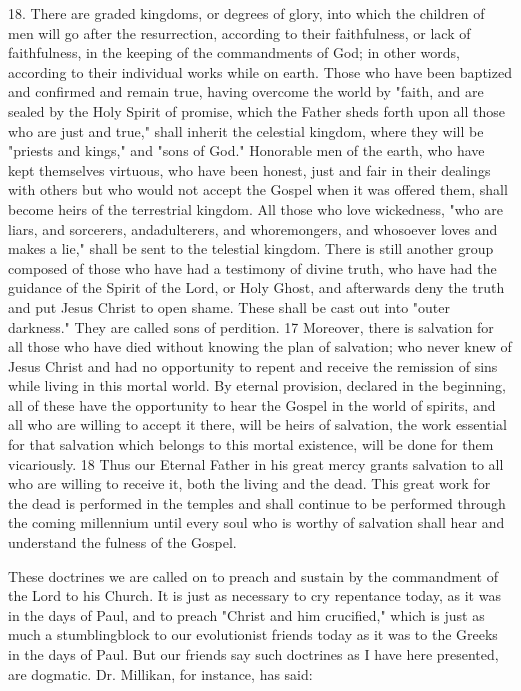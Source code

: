 18. There are graded kingdoms, or degrees of glory, into which the children of men will go
after the resurrection, according to their faithfulness, or lack of faithfulness, in the keeping of
the commandments of God; in other words, according to their individual works while on
earth. Those who have been baptized and confirmed and remain true, having overcome the
world by "faith, and are sealed by the Holy Spirit of promise, which the Father sheds forth
upon all those who are just and true," shall inherit the celestial kingdom, where they will be
"priests and kings," and "sons of God." Honorable men of the earth, who have kept
themselves virtuous, who have been honest, just and fair in their dealings with others but
who would not accept the Gospel when it was offered them, shall become heirs of the
terrestrial kingdom. All those who love wickedness, "who are liars, and sorcerers, andadulterers, and whoremongers, and whosoever loves and makes a lie," shall be sent to the
telestial kingdom. There is still another group composed of those who have had a testimony
of divine truth, who have had the guidance of the Spirit of the Lord, or Holy Ghost, and
afterwards deny the truth and put Jesus Christ to open shame. These shall be cast out into
"outer darkness." They are called sons of perdition. 17 Moreover, there is salvation for all
those who have died without knowing the plan of salvation; who never knew of Jesus Christ
and had no opportunity to repent and receive the remission of sins while living in this mortal
world. By eternal provision, declared in the beginning, all of these have the opportunity to
hear the Gospel in the world of spirits, and all who are willing to accept it there, will be heirs
of salvation, the work essential for that salvation which belongs to this mortal existence, will
be done for them vicariously. 18 Thus our Eternal Father in his great mercy grants salvation
to all who are willing to receive it, both the living and the dead. This great work for the dead
is performed in the temples and shall continue to be performed through the coming
millennium until every soul who is worthy of salvation shall hear and understand the fulness
of the Gospel.

These doctrines we are called on to preach and sustain by the commandment of the Lord to
his Church. It is just as necessary to cry repentance today, as it was in the days of Paul, and
to preach "Christ and him crucified," which is just as much a stumblingblock to our
evolutionist friends today as it was to the Greeks in the days of Paul. But our friends say such
doctrines as I have here presented, are dogmatic. Dr. Millikan, for instance, has said:

